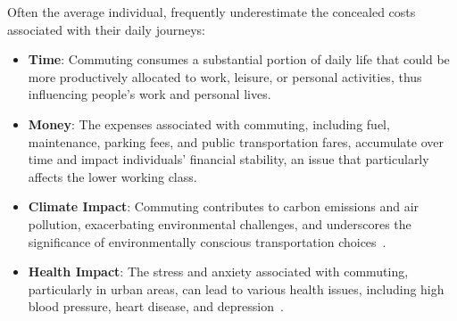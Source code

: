 Often the average individual, frequently underestimate the concealed costs associated with their daily journeys:

\begin{itemize}
    \item \textbf{Time}: Commuting consumes a substantial portion of daily life that could be more productively
    allocated to work, leisure, or personal activities, thus influencing people's work and personal lives.
    \item \textbf{Money}: The expenses associated with commuting, including fuel, maintenance, parking fees, and public
    transportation fares, accumulate over time and impact individuals' financial stability, an issue that particularly
    affects the lower working class.
    \item \textbf{Climate Impact}: Commuting contributes to carbon emissions and air pollution, exacerbating
    environmental challenges, and underscores the significance of environmentally conscious transportation
    choices~\cite{alma9921355859805762}.
    \item \textbf{Health Impact}: The stress and anxiety associated with commuting, particularly in urban areas, can
    lead to various health issues, including high blood pressure, heart disease, and
    depression~\cite{commuting-and-your-health}.
\end{itemize}
